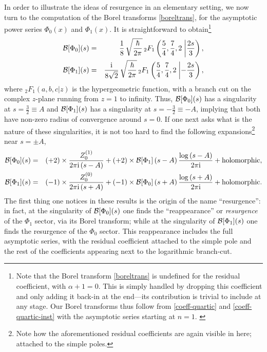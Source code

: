 \documentclass[11pt,a4paper]{article}
\newcommand{\CB}{{\cal B}}
\newcommand{\bea}{\begin{eqnarray}}
\newcommand{\eea}{\end{eqnarray}}
\newcommand{\rmi}{{\mathrm{i}}}
\begin{document}
In order to illustrate the ideas of resurgence in an elementary setting, we now turn to the computation of the Borel transforms \eqref{boreltrans}, for the asymptotic power series $\Phi_{0} (x)$ and $\Phi_{1} (x)$. It is straightforward to obtain\footnote{Note that the Borel transform \eqref{boreltrans} is undefined for the residual coefficient, with $\alpha+1=0$. This is simply handled by dropping this coefficient and only adding it back-in at the end---its contribution is trivial to include at any stage. Our Borel transforms thus follow from \eqref{coeff-quartic} and \eqref{coeff-quartic-inst} with the asymptotic series starting at $n=1$.
\label{foot:residual-coefficients}}
%
\bea 
\label{borel-quartic-int}
\CB [\Phi_{0}] (s) &=& \frac{1}{8}\, \sqrt{\frac{\hbar}{2\pi}}\, {}_2 F_{1} \left( \frac{5}{4}, \frac{7}{4}, 2 \right. \left| \frac{2s}{3} \right), \\
\label{borel-quartic-int-inst}
\CB [\Phi_{1}] (s) &=& \frac{\rmi}{8 \sqrt{2}}\, \sqrt{\frac{\hbar}{2\pi}}\, {}_2 F_{1} \left( \frac{5}{4}, \frac{7}{4}, 2 \right. \left| - \frac{2s}{3} \right),
\eea
%
\noindent
where ${}_2 F_{1} \left( a, b, c \right. \left| z \right)$ is the hypergeometric function, with a branch cut on the complex $z$-plane running from $z=1$ to infinity. Thus, $\CB [\Phi_{0}] (s)$ has a singularity at $s = \frac{3}{2} \equiv A$ and $\CB [\Phi_{1}] (s)$ has a singularity at $s = - \frac{3}{2} \equiv - A$, implying that both have non-zero radius of convergence around $s=0$. If one next asks what is the nature of these singularities, it is not too hard to find the following expansions\footnote{Note how the aforementioned residual coefficients are again visible in here; attached to the simple poles.} near $s=\pm A$,
%
\bea
\label{borel-quartic-int-expanded}
\CB [\Phi_{0}] (s) &=& \left( + 2 \right) \times \frac{Z_{0}^{(1)}}{2\pi\rmi \left( s-A \right)} + \left( + 2 \right) \times \CB [\Phi_{1}] \left( s-A \right) \frac{\log \left( s-A \right)}{2\pi\rmi} + \text{holomorphic}, \\
\label{borel-quartic-int-expanded-inst}
\CB [\Phi_{1}] (s) &=& \left( - 1 \right) \times \frac{Z_{0}^{(0)}}{2\pi\rmi \left( s+A \right)} + \left( - 1 \right) \times \CB [\Phi_{0}] \left( s+A \right) \frac{\log \left( s+A \right)}{2\pi\rmi} + \text{holomorphic}.
\eea
%
\noindent
The first thing one notices in these results is the origin of the name ``resurgence'': in fact, at the singularity of $\CB [\Phi_{0}] (s)$ one finds the ``reappearance'' or \textit{resurgence} of the $\Phi_{1}$ sector, via its Borel transform; while at the singularity of $\CB [\Phi_{1}] (s)$ one finds the resurgence of the $\Phi_{0}$ sector. This reappearance includes the full asymptotic series, with the residual coefficient attached to the simple pole and the rest of the coefficients appearing next to the logarithmic branch-cut.
\end{document}
